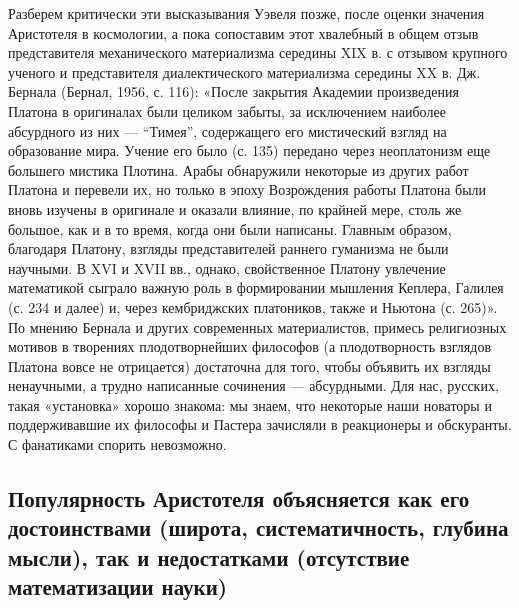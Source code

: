 Разберем критически эти высказывания Уэвеля позже, после оценки
значения Аристотеля в космологии, а пока сопоставим этот хвалебный в
общем отзыв представителя механического материализма середины XIX в. с
отзывом крупного ученого и представителя диалектического материализма
середины XX в. Дж. Бернала (Бернал, 1956, с. 116): «После закрытия
Академии произведения Платона в оригиналах были целиком забыты, за
исключением наиболее абсурдного из них --- ``Тимея'', содержащего его
мистический взгляд на образование мира. Учение его было (с. 135)
передано через неоплатонизм еще большего мистика Плотина. Арабы
обнаружили некоторые из других работ Платона и перевели их, но только
в эпоху Возрождения работы Платона были вновь изучены в оригинале и
оказали влияние, по крайней мере, столь же большое, как и в то время,
когда они были написаны. Главным образом, благодаря Платону, взгляды
представителей раннего гуманизма не были научными. В XVI и XVII вв.,
однако, свойственное Платону увлечение математикой сыграло важную роль
в формировании мышления Кеплера, Галилея (с. 234 и далее) и, через
кембриджских платоников, также и Ньютона (с. 265)». По мнению Бернала
и других современных материалистов, примесь религиозных мотивов в
творениях плодотворнейших философов (а плодотворность взглядов Платона
вовсе не отрицается) достаточна для того, чтобы объявить их взгляды
ненаучными, а трудно написанные сочинения --- абсурдными. Для нас,
русских, такая «установка» хорошо знакома: мы знаем, что некоторые
наши новаторы и поддерживавшие их философы и Пастера зачисляли в
реакционеры и обскуранты. С фанатиками спорить невозможно.

\subsection{Популярность Аристотеля объясняется как его достоинствами
(широта, систематичность, глубина мысли), так и недостатками
(отсутствие математизации науки)}

